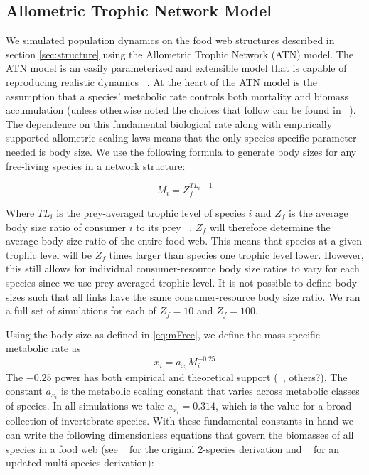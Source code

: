 \documentclass[11pt]{amsart}
\begin{document}
\subsection{Allometric Trophic Network Model}

We simulated population dynamics on the food web structures described in section \ref{sec:structure} using the Allometric Trophic Network (ATN) model.  The ATN model is an easily parameterized and extensible model that is capable of reproducing realistic dynamics ~\cite{Boit2012}.  At the heart of the ATN model is the assumption that a species' metabolic rate controls both mortality and biomass accumulation (unless otherwise noted the choices that follow can be found in ~\cite{Brose2006}).  The dependence on this fundamental biological rate along with empirically supported allometric scaling laws means that the only species-specific parameter needed is body size.  We use the following formula to generate body sizes for any free-living species in a network structure:

\begin{equation}
M_i= Z_f^{TL_i-1}\label{eq:mFree}
\end{equation}

Where $TL_i$ is the prey-averaged trophic level of species $i$ and $Z_f$ is the average body size ratio of consumer $i$ to its prey ~\cite{Williams2004}.  $Z_f$ will therefore determine the average body size ratio of the entire food web.  This means that species at a given trophic level will be $Z_f$ times larger than species one trophic level lower.  However, this still allows for individual consumer-resource body size ratios to vary for each species since we use prey-averaged trophic level.  It is not possible to define body sizes such that all links have the same consumer-resource body size ratio.  We ran a full set of simulations for each of $Z_f = 10$ and $Z_f = 100$.  

Using the body size as defined in \eqref{eq:mFree}, we define the mass-specific metabolic rate as
\begin{equation}
x_i = a_{x_i} M_i^{-0.25}\label{eq:x}
\end{equation}
The $-0.25$ power has both empirical and theoretical support (~\cite{Brown2004}, others?).  The constant $a_{x_i}$ is the metabolic scaling constant that varies across metabolic classes of species.  In all simulations we take $a_{x_i}=0.314$, which is the value for a broad collection of invertebrate species.  With these fundamental constants in hand we can write the following dimensionless equations that govern the biomasses of all species in a food web (see ~\cite{Yodzis1992} for the original 2-species derivation and ~\cite{Williams2007} for an updated multi species derivation): 
\end{document}
